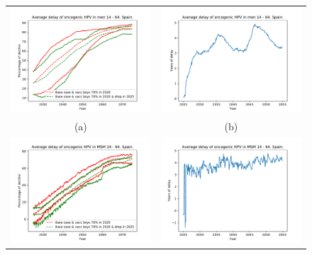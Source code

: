 \begin{figure}[!]
	\centering
	\begin{tabular}{cc}
		\includegraphics[width=0.5\linewidth]{IMGs/11.-Resilencia/2_y_4/decline_onco_hom.pdf}	& 
		\includegraphics[width=0.5\linewidth]{IMGs/11.-Resilencia/2_y_4/resilencia_onco_hom.pdf}  \\ 
		(a)	& (b) \\ 
		\includegraphics[width=0.5\linewidth]{IMGs/11.-Resilencia/2_y_4/decline_onco_MSM.pdf}	& 
		\includegraphics[width=0.5\linewidth]{IMGs/11.-Resilencia/2_y_4/resilencia_onco_MSM.pdf}  \\ 

\end{tabular}
\end{figure}

